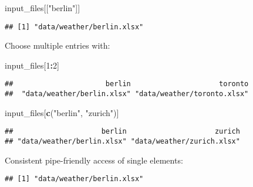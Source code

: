 \documentclass[]{book}
\newenvironment{Shaded}{\begin{snugshade}}{\end{snugshade}}
\newcommand{\DecValTok}[1]{\textcolor[rgb]{0.00,0.00,0.81}{#1}}
\newcommand{\KeywordTok}[1]{\textcolor[rgb]{0.13,0.29,0.53}{\textbf{#1}}}
\newcommand{\NormalTok}[1]{#1}
\newcommand{\OperatorTok}[1]{\textcolor[rgb]{0.81,0.36,0.00}{\textbf{#1}}}
\newcommand{\StringTok}[1]{\textcolor[rgb]{0.31,0.60,0.02}{#1}}
\begin{document}
\begin{Shaded}
\begin{Highlighting}[]
\NormalTok{input_files[[}\StringTok{"berlin"}\NormalTok{]]}
\end{Highlighting}
\end{Shaded}

\begin{verbatim}
## [1] "data/weather/berlin.xlsx"
\end{verbatim}

Choose multiple entries with:

\begin{Shaded}
\begin{Highlighting}[]
\NormalTok{input_files[}\DecValTok{1}\OperatorTok{:}\DecValTok{2}\NormalTok{]}
\end{Highlighting}
\end{Shaded}

\begin{verbatim}
##                      berlin                     toronto 
##  "data/weather/berlin.xlsx" "data/weather/toronto.xlsx"
\end{verbatim}

\begin{Shaded}
\begin{Highlighting}[]
\NormalTok{input_files[}\KeywordTok{c}\NormalTok{(}\StringTok{"berlin"}\NormalTok{, }\StringTok{"zurich"}\NormalTok{)]}
\end{Highlighting}
\end{Shaded}

\begin{verbatim}
##                     berlin                     zurich 
## "data/weather/berlin.xlsx" "data/weather/zurich.xlsx"
\end{verbatim}

Consistent pipe-friendly access of single elements:

\begin{Shaded}
\end{Shaded}

\begin{verbatim}
## [1] "data/weather/berlin.xlsx"
\end{verbatim}

\begin{Shaded}
\end{Shaded}
\end{document}
